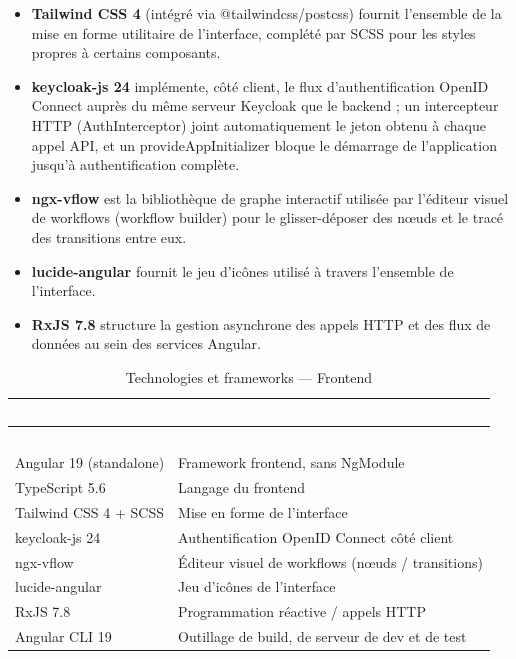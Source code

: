 \documentclass[12pt,a4paper]{report}
\begin{document}
\begin{itemize}
  \item \textbf{Tailwind CSS 4} (intégré via @tailwindcss/postcss) fournit l'ensemble de la mise en forme utilitaire de l'interface, complété par SCSS pour les styles propres à certains composants.
  \item \textbf{keycloak-js 24} implémente, côté client, le flux d'authentification OpenID Connect auprès du même serveur Keycloak que le backend ; un intercepteur HTTP (AuthInterceptor) joint automatiquement le jeton obtenu à chaque appel API, et un provideAppInitializer bloque le démarrage de l'application jusqu'à authentification complète.
  \item \textbf{ngx-vflow} est la bibliothèque de graphe interactif utilisée par l'éditeur visuel de workflows (workflow builder) pour le glisser-déposer des n\oe uds et le tracé des transitions entre eux.
  \item \textbf{lucide-angular} fournit le jeu d'icônes utilisé à travers l'ensemble de l'interface.
  \item \textbf{RxJS 7.8} structure la gestion asynchrone des appels HTTP et des flux de données au sein des services Angular.
\end{itemize}

\begin{longtable}{@{}>{\raggedright\arraybackslash}p{}p{}@{}}
\caption{Technologies et frameworks --- Frontend}\\
\hline
\rowcolor{darkblue}\textcolor{white}{\textbf{Technologie}} & \textcolor{white}{\textbf{Rôle dans le projet}} \\
\hline
\endfirsthead
\hline
\rowcolor{darkblue}\textcolor{white}{\textbf{Technologie}} & \textcolor{white}{\textbf{Rôle dans le projet}} \\
\hline
\endhead
\hline
\endfoot
Angular 19 (standalone) & Framework frontend, sans NgModule \\
\hline
TypeScript 5.6 & Langage du frontend \\
\hline
Tailwind CSS 4 + SCSS & Mise en forme de l'interface \\
\hline
keycloak-js 24 & Authentification OpenID Connect côté client \\
\hline
ngx-vflow & Éditeur visuel de workflows (n\oe uds / transitions) \\
\hline
lucide-angular & Jeu d'icônes de l'interface \\
\hline
RxJS 7.8 & Programmation réactive / appels HTTP \\
\hline
Angular CLI 19 & Outillage de build, de serveur de dev et de test \\
\hline
\end{longtable}
\end{document}
